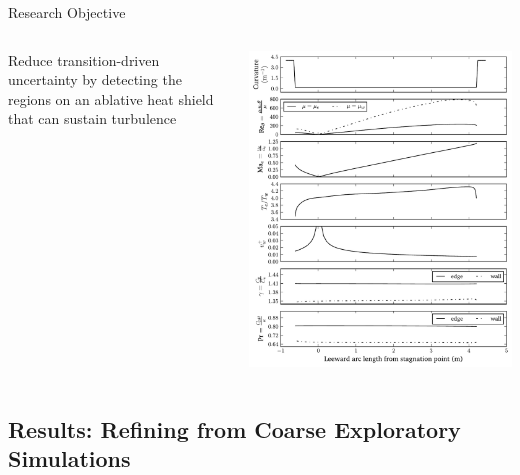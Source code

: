 \documentclass[mathserif]{beamer}
\begin{document}
\begin{frame}{Research Objective}
    \begin{columns}[c,onlytextwidth]
    \begin{column}{.35\linewidth}
        Reduce transition-driven uncertainty by detecting
        the regions on an ablative heat shield that can sustain turbulence
    \end{column}
    \begin{column}{.65\linewidth}
        \vspace{-3em}
        \begin{flushright}
            \includegraphics[height=0.99\textheight]{cevisslam_summary1}
        \end{flushright}
    \end{column}
    \end{columns}
\end{frame}

\subsection{Results: Refining from Coarse Exploratory Simulations}
\end{document}
